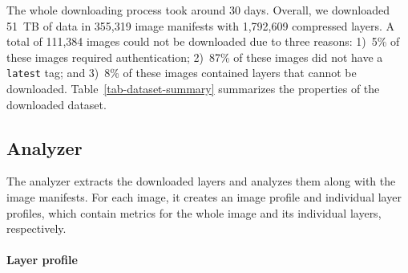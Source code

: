 The whole downloading process took around 30 days.
%
Overall, we downloaded 51~TB of data in 355,319 image manifests with 1,792,609
compressed layers.
%
A total of 111,384 images could not be downloaded due to three reasons:
%
1)~5\% of these images required authentication;
2)~87\% of these images did not have a \texttt{latest} tag; and
3)~8\% of these images contained layers that cannot be downloaded.
Table~\ref{tab-dataset-summary} summarizes the properties of the downloaded
dataset.



\subsection{Analyzer}
\label{sec:analyzer}

The analyzer extracts the downloaded layers
and analyzes them along with the image manifests.
For each image, it creates an image profile and individual layer profiles,
which contain metrics for the whole image and
its individual layers, respectively.

\paragraph{Layer profile}

